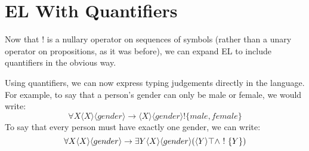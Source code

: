\section{EL With Quantifiers}
Now that $!$ is a nullary operator on sequences of symbols (rather than a unary operator on propositions, as it was before), we can expand EL to include quantifiers in the obvious way.

Using quantifiers, we can now express typing judgements directly in the language. For example, to say that a person's gender can only be male or female, we would write:
\[
\forall X \langle X \rangle \langle gender \rangle \rightarrow \langle X \rangle \langle gender \rangle !\{male, female\}
\]
To say that every person must have exactly one gender, we can write:
\[
\forall X  \langle X \rangle \langle gender \rangle \rightarrow \exists Y \langle X \rangle \langle gender \rangle (\langle Y \rangle \top \land \ ! \  \{Y\})
\]


